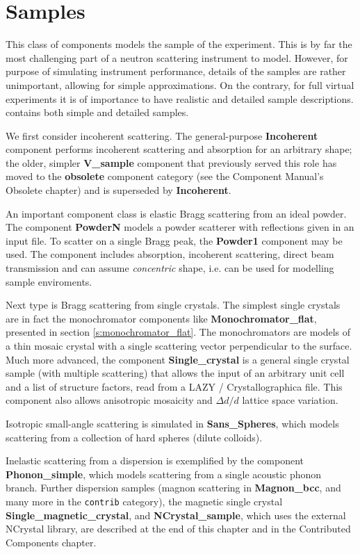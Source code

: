 \chapter{Samples}
\label{c:samples}

This class of components models the sample of the experiment.
This is by far the most challenging part of a neutron scattering
instrument to model. However, for purpose of simulating
instrument performance, details of the samples are rather unimportant,
allowing for simple approximations. On the contrary, for full
virtual experiments it is of importance to have realistic and
detailed sample descriptions. \MCS contains both simple and detailed
samples.

We first consider incoherent scattering. The general-purpose
\textbf{Incoherent} component performs incoherent scattering and absorption
for an arbitrary shape; the older, simpler \textbf{V\_sample} component that
previously served this role has moved to the \textbf{obsolete} component
category (see the Component Manual's Obsolete chapter) and is superseded by
\textbf{Incoherent}.

An important component class is elastic Bragg scattering from an ideal powder.
The component \textbf{PowderN} models a powder scatterer with reflections
given in an input file. To scatter on a single Bragg peak, the \textbf{Powder1} component may be used.
The component includes absorption, incoherent scattering, direct beam
transmission and can assume \emph{concentric} shape, i.e. can be used
for modelling sample enviroments.

Next type is Bragg scattering from single crystals.
The simplest single crystals are in fact the monochromator components
like \textbf{Monochromator\_flat}, presented in section \ref{s:monochromator_flat}.
The monochromators are models of a thin mosaic crystal
with a single scattering vector perpendicular to the surface.
Much more advanced, the component \textbf{Single\_crystal}
is a general single crystal sample (with multiple scattering) that allows
the input of an arbitrary unit cell and a list of structure factors, read
from a LAZY / Crystallographica file.
This component also allows anisotropic mosaicity
and $\Delta d/d$ lattice space variation.

Isotropic small-angle scattering is simulated in \textbf{Sans\_Spheres},
which models scattering from a collection of hard spheres (dilute colloids).

Inelastic scattering from a dispersion is exemplified by
the component \textbf{Phonon\_simple}, which models
scattering from a single acoustic phonon branch.
Further dispersion samples (magnon scattering in \textbf{Magnon\_bcc}, and
many more in the \texttt{contrib} category), the magnetic single crystal
\textbf{Single\_magnetic\_crystal}, and \textbf{NCrystal\_sample}, which
uses the external NCrystal library, are described at the end of this chapter
and in the Contributed Components chapter.

